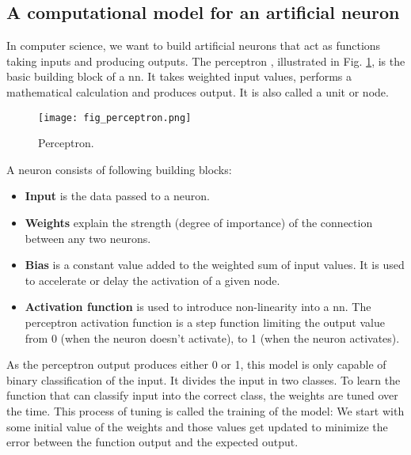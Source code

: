 \subsection{A computational model for an artificial neuron}
In computer science, we want to build artificial neurons that act as functions taking inputs and producing outputs. The perceptron \cite{rosenblatt1958perceptron, minsky2017perceptrons}, illustrated in Fig. \ref{fig:perceptron}, is the basic building block of a \acrfull{nn}. It takes weighted input values, performs a mathematical calculation and produces output. It is also called a unit or node.
\begin{figure}[ht]
    \begin{center}
    \texttt{[image: fig\_perceptron.png]}
    \caption{Perceptron.}
    \label{fig:perceptron}
    \end{center}
\end{figure}
A neuron consists of following building blocks:
\begin{itemize}
    \item \textbf{Input} is the data passed to a neuron.
    \item \textbf{Weights} explain the strength (degree of importance) of the connection between any two neurons.
    \item \textbf{Bias} is a constant value added to the weighted sum of input values. It is used to accelerate or delay the activation of a given node.
    \item \textbf{Activation function} is used to introduce non-linearity into a \acrshort{nn}. The perceptron activation function is a step function limiting the output value from 0 (when the neuron doesn't activate), to 1 (when the neuron activates).
\end{itemize}
As the perceptron output produces either 0 or 1, this model is only capable of binary classification of the input. It divides the input in two classes. To learn the function that can classify input into the correct class, the weights are tuned over the time. This process of tuning is called the training of the model: We start with some initial value of the weights and those values get updated to minimize the error between the function output and the expected output.

